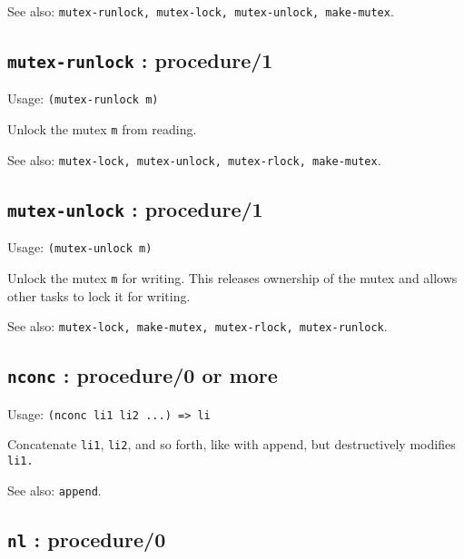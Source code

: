 \documentclass[
]{article}
\newcommand{\passthrough}[1]{#1}
\begin{document}
See also:
\passthrough{\lstinline!mutex-runlock, mutex-lock, mutex-unlock, make-mutex!}.

\hypertarget{mutex-runlock-procedure1-1}{%
\subsection{\texorpdfstring{\texttt{mutex-runlock} :
procedure/1}{mutex-runlock : procedure/1}}\label{mutex-runlock-procedure1-1}}

Usage: \passthrough{\lstinline!(mutex-runlock m)!}

Unlock the mutex \passthrough{\lstinline!m!} from reading.

See also:
\passthrough{\lstinline!mutex-lock, mutex-unlock, mutex-rlock, make-mutex!}.

\hypertarget{mutex-unlock-procedure1-1}{%
\subsection{\texorpdfstring{\texttt{mutex-unlock} :
procedure/1}{mutex-unlock : procedure/1}}\label{mutex-unlock-procedure1-1}}

Usage: \passthrough{\lstinline!(mutex-unlock m)!}

Unlock the mutex \passthrough{\lstinline!m!} for writing. This releases
ownership of the mutex and allows other tasks to lock it for writing.

See also:
\passthrough{\lstinline!mutex-lock, make-mutex, mutex-rlock, mutex-runlock!}.

\hypertarget{nconc-procedure0-or-more-1}{%
\subsection{\texorpdfstring{\texttt{nconc} : procedure/0 or
more}{nconc : procedure/0 or more}}\label{nconc-procedure0-or-more-1}}

Usage: \passthrough{\lstinline!(nconc li1 li2 ...) => li!}

Concatenate \passthrough{\lstinline!li1!},
\passthrough{\lstinline!li2!}, and so forth, like with append, but
destructively modifies \passthrough{\lstinline!li1.!}

See also: \passthrough{\lstinline!append!}.

\hypertarget{nl-procedure0-1}{%
\subsection{\texorpdfstring{\texttt{nl} :
procedure/0}{nl : procedure/0}}\label{nl-procedure0-1}}
\end{document}
